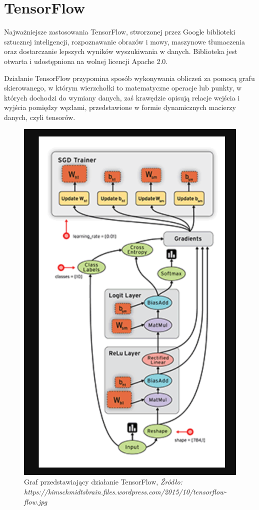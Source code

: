 \documentclass[brudnopis]{xmgr}
\begin{document}
\section{TensorFlow}

Najważniejsze zastosowania TensorFlow\cite{16}, stworzonej przez Google biblioteki sztucznej inteligencji, rozpoznawanie obrazów i mowy, maszynowe tłumaczenia oraz dostarczanie lepszych wyników wyszukiwania w danych. Biblioteka jest otwarta i udostępniona na wolnej licencji Apache 2.0.

Działanie TensorFlow przypomina sposób wykonywania obliczeń za pomocą grafu skierowanego, w którym wierzchołki to matematyczne operacje lub punkty, w których dochodzi do wymiany danych, zaś krawędzie opisują relacje wejścia i wyjścia pomiędzy węzłami, przedstawione w formie dynamicznych macierzy danych, czyli tensorów.

\begin{figure}[!tbh]
\centering
\includegraphics[width=.8\hsize]{fig/tf}
\caption{Graf przedstawiający działanie TensorFlow, \emph{Źródło: https://kimschmidtsbrain.files.wordpress.com/2015/10/tensorflow-flow.jpg}}
\end{figure}
\newpage
\end{document}
